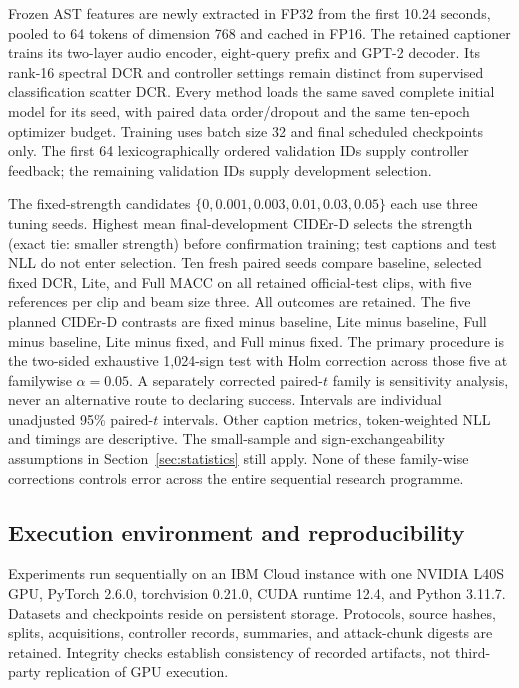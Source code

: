 \documentclass[10pt,a4paper,twocolumn]{article}
\begin{document}
Frozen AST features are newly extracted in FP32 from the first 10.24
seconds, pooled to 64 tokens of dimension 768 and cached in FP16.
The retained captioner trains its two-layer audio encoder, eight-query
prefix and GPT-2 decoder. Its rank-16 spectral DCR and controller settings
remain distinct from supervised classification scatter DCR. Every method
loads the same saved complete initial model for its seed, with paired
data order/dropout and the same ten-epoch optimizer budget. Training uses
batch size 32 and final scheduled checkpoints only. The first 64
lexicographically ordered validation IDs supply controller feedback;
the remaining validation IDs supply development selection.

The fixed-strength candidates $\{0,0.001,0.003,0.01,0.03,0.05\}$ each
use three tuning seeds. Highest mean final-development CIDEr-D selects
the strength (exact tie: smaller strength) before confirmation training;
test captions and test NLL do not enter selection. Ten fresh paired seeds
compare baseline, selected fixed DCR, Lite, and Full MACC on all retained
official-test clips, with five references per clip and beam size three.
All outcomes are retained. The five planned CIDEr-D contrasts are fixed
minus baseline, Lite minus baseline, Full minus baseline, Lite minus
fixed, and Full minus fixed. The primary procedure is the two-sided
exhaustive 1,024-sign test with Holm correction across those five at
familywise $\alpha=0.05$. A separately corrected paired-$t$ family is
sensitivity analysis, never an alternative route to declaring success.
Intervals are individual unadjusted 95\% paired-$t$ intervals. Other
caption metrics, token-weighted NLL and timings are descriptive.
The small-sample and sign-exchangeability assumptions in
Section~\ref{sec:statistics} still apply. None of these family-wise
corrections controls error across the entire sequential research programme.

\subsection{Execution environment and reproducibility}

Experiments run sequentially on an IBM Cloud instance with one
NVIDIA L40S GPU, PyTorch 2.6.0, torchvision 0.21.0,
CUDA runtime 12.4, and Python 3.11.7.
Datasets and checkpoints reside on persistent storage.
Protocols, source hashes, splits, acquisitions, controller records,
summaries, and attack-chunk digests are retained.
Integrity checks establish consistency of recorded artifacts,
not third-party replication of GPU execution.
\end{document}
